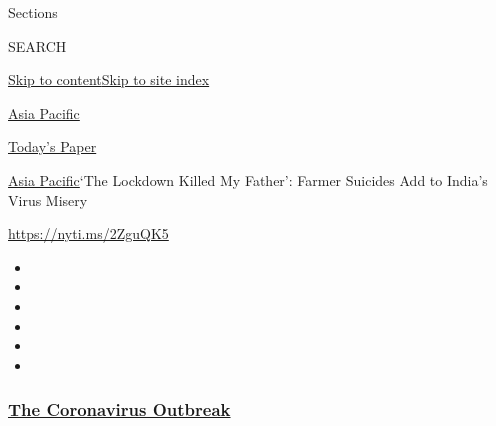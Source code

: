 Sections

SEARCH

\protect\hyperlink{site-content}{Skip to
content}\protect\hyperlink{site-index}{Skip to site index}

\href{https://www.nytimes3xbfgragh.onion/section/world/asia}{Asia
Pacific}

\href{https://myaccount.nytimes3xbfgragh.onion/auth/login?response_type=cookie\&client_id=vi}{}

\href{https://www.nytimes3xbfgragh.onion/section/todayspaper}{Today's
Paper}

\href{/section/world/asia}{Asia Pacific}\textbar{}`The Lockdown Killed
My Father': Farmer Suicides Add to India's Virus Misery

\url{https://nyti.ms/2ZguQK5}

\begin{itemize}
\item
\item
\item
\item
\item
\item
\end{itemize}

\hypertarget{the-coronavirus-outbreak}{%
\subsubsection{\texorpdfstring{\href{https://www.nytimes3xbfgragh.onion/news-event/coronavirus?name=styln-coronavirus-national\&region=TOP_BANNER\&block=storyline_menu_recirc\&action=click\&pgtype=Article\&impression_id=11499020-f284-11ea-ae55-8bacd3660bac\&variant=undefined}{The
Coronavirus
Outbreak}}{The Coronavirus Outbreak}}\label{the-coronavirus-outbreak}}

